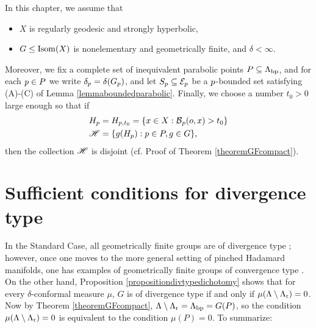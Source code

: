 \begin{standingassumptions}
\label{standingassumptionsGFmeasures}
In this chapter, we assume that
\begin{itemize}
\item[(I)] $X$ is regularly geodesic and strongly hyperbolic,
\item[(II)] $G\leq\operatorname{Isom}(X)$ is nonelementary and geometrically finite, and $\delta < \infty$.
\end{itemize}
Moreover, we fix a complete set of inequivalent parabolic points $P\subseteq\Lambda_{\mathrm{bp}}$, and for each $p\in P$ we write $\delta_p = \delta(G_p)$, and let $S_p\subseteq\mathcal E_p$ be a $p$-bounded set satisfying (A)-(C) of Lemma \ref{lemmaboundedparabolic}. Finally, we choose a number $t_0 > 0$ large enough so that if
\begin{align*}
H_p &= H_{p,t_0} = \{ x\in X : \operatorname{\mathcal B}_p(o,x) > t_0 \}\\
\mathscr H &= \{ g(H_p) : p\in P, g\in G\},
\end{align*}
then the collection $\mathscr H$ is disjoint (cf. Proof of Theorem \ref{theoremGFcompact}).
\end{standingassumptions}




\section{Sufficient conditions for divergence type}
\label{subsectiondivergencetype}

In the Standard Case, all geometrically finite groups are of divergence type \cite[Proposition 2]{Sullivan_entropy}; however, once one moves to the more general setting of pinched Hadamard manifolds, one has examples of geometrically finite groups of convergence type \cite[Th\'eor\`eme C]{DOP}. On the other hand, Proposition \ref{propositiondivtypedichotomy} shows that for every $\delta$-conformal measure $\mu$, $G$ is of divergence type if and only if $\mu(\Lambda\setminus\Lambda_{\mathrm r}) = 0$. Now by Theorem \ref{theoremGFcompact}, $\Lambda\setminus\Lambda_{\mathrm r} = \Lambda_{\mathrm{bp}} = G(P)$, so the condition $\mu(\Lambda\setminus\Lambda_{\mathrm r}) = 0$ is equivalent to the condition $\mu(P) = 0$. To summarize:

